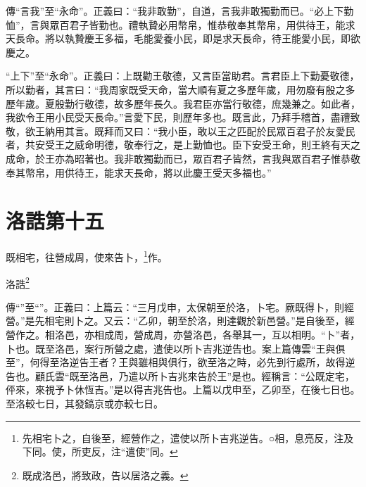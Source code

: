 {\noindent\zhuan{}\fzbyks 傳“言我”至“永命”。正義曰：“我非敢勤”，自道，言我非敢獨勤而已。“必上下勤恤”，言與眾百君子皆勤也。禮執贄必用幣帛，惟恭敬奉其幣帛，用供待王，能求天長命。將以執贄慶王多福，毛能愛養小民，即是求天長命，待王能愛小民，即欲慶之。 \par}

{\noindent\shu{}\fzkt “上下”至“永命”。正義曰：上既勸王敬德，又言臣當助君。言君臣上下勤憂敬德，所以勤者，其言曰：“我周家既受天命，當大順有夏之多歷年歲，用勿廢有殷之多歷年歲。夏殷勤行敬德，故多歷年長久。我君臣亦當行敬德，庶幾兼之。如此者，我欲令王用小民受天長命。”言愛下民，則歷年多也。既言此，乃拜手稽首，盡禮致敬，欲王納用其言。既拜而又曰：“我小臣，敢以王之匹配於民眾百君子於友愛民者，共安受王之威命明德，敬奉行之，是上勤恤也。臣下安受王命，則王終有天之成命，於王亦為昭著也。我非敢獨勤而已，眾百君子皆然，言我與眾百君子惟恭敬奉其幣帛，用供待王，能求天長命，將以此慶王受天多福也。” \par}

\section{洛誥第十五}


既相宅，往營成周，使來告卜，\footnote{先相宅卜之，自後至，經營作之，遣使以所卜吉兆逆告。○相，息亮反，注及下同。使，所吏反，注“遣使”同。}作。

洛誥\footnote{既成洛邑，將致政，告以居洛之義。}


{\noindent\zhuan{}\fzbyks 傳“”至“”。正義曰：上篇云：“三月戊申，太保朝至於洛，卜宅。厥既得卜，則經營。”是先相宅則卜之。又云：“乙卯，朝至於洛，則達觀於新邑營。”是自後至，經營作之。相洛邑，亦相成周，營成周，亦營洛邑，各舉其一，互以相明。“卜”者，卜也。既至洛邑，案行所營之處，遣使以所卜吉兆逆告也。案上篇傳雲“王與俱至”，何得至洛逆告王者？王與雖相與俱行，欲至洛之時，必先到行處所，故得逆告也。顧氏雲“既至洛邑，乃遣以所卜吉兆來告於王”是也。經稱言：“公既定宅，伻來，來視予卜休恆吉。”是以得吉兆告也。上篇以戊申至，乙卯至，在後七日也。至洛較七日，其發鎬京或亦較七日。 \par}

